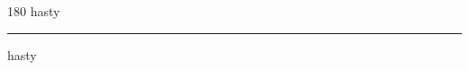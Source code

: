 
\begin{frame}
\begin{center}
\begin{turn}{180}
{\fontsize{2.5cm}{1em}\selectfont hasty}
\end{turn}
\vspace{1em}\par  
\hrule
\vspace{1em}\par  
{\fontsize{2.5cm}{1em}\selectfont hasty}
\end{center}
\end{frame}
